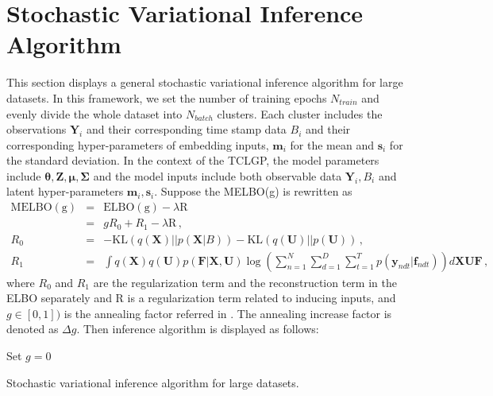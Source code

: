 \section{Stochastic Variational Inference Algorithm}
\label{sec: scia}
This section displays a general stochastic variational inference algorithm for large datasets. In this framework, we set the number of training epochs $N_{train}$ and evenly divide the whole dataset into $N_{batch}$ clusters. Each cluster includes the observations $\bm Y_i$ and their corresponding time stamp data $B_i$ and their corresponding hyper-parameters of embedding inputs, $\bm m_i$ for the mean and $\bm s_i$ for the standard deviation. In the context of the TCLGP, the model parameters include $\bm \theta, \bm Z, \bm \mu, \bm \Sigma$ and the model inputs include both observable data $\bm Y_i, B_i$ and latent hyper-parameters $\bm m_i, \bm s_i$. Suppose the MELBO(g) is rewritten as
\begin{eqnarray}
\mathrm{MELBO(g)} & = & \mathrm{ELBO(g)} - \lambda\mathrm{R} \nonumber \\
& = & gR_0 + R_1 - \lambda\mathrm{R}\,, \nonumber \\
R_0 & = & -\mathrm{KL}(q(\bm X) || p(\bm X | B)) - \mathrm{KL}(q(\bm U) || p(\bm U)) \,, \nonumber \\
R_1 & = & \int q(\bm X) q(\bm  U) p(\bm F | \bm X, \bm U) \log\left(\sum_{n = 1}^{N}\sum_{d = 1}^{D}\sum_{t = 1}^{T} p(\bm y_{ndt} | \bm f_{ndt})\right)d\bm X \bm U \bm F \,, \nonumber
\end{eqnarray}
where $R_0$ and $R_1$ are the regularization term and the reconstruction term 
in the ELBO separately and $\mathrm{R}$ is a regularization term related to inducing inputs, and $g\in[0,1])$ is the annealing factor referred in \cite{Bowman_2015}. The annealing increase factor is denoted as $\Delta g$. Then inference algorithm is displayed as follows: 

\begin{algorithm}[H]
	\SetAlgoLined
	Set $g = 0$\;
	\caption{Stochastic variational inference algorithm for large datasets.}
\end{algorithm}
